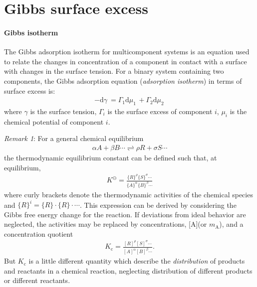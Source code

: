\section{Gibbs surface excess}\label{gibbs_surface_excess}
\paragraph{Gibbs isotherm}
The Gibbs adsorption isotherm for multicomponent systems is an equation used to relate the changes in concentration 
of a component in contact with a surface with changes in the surface tension. For a binary system containing two components, 
the Gibbs adsorption equation (\emph{adsorption isotherm}) in terms of surface excess is:
\begin{eqnarray}
\label{1}
-\mathrm{d}\gamma\ = \Gamma_1\mathrm{d}\mu_1\, + \Gamma_2\mathrm{d}\mu_2\,
\end{eqnarray}
where
$\gamma$ is the surface tension,
$\Gamma_i$ is the surface excess of component $i$,
$\mu_i$ is the chemical potential of component $i$.

\emph{Remark 1}:
For a general chemical equilibrium
\begin{eqnarray}
\label{c1}
\alpha A +\beta B \cdots \rightleftharpoons \rho R+\sigma S \cdots
\end{eqnarray}
the thermodynamic equilibrium constant can be defined such that, at equilibrium,
\begin{eqnarray}
\label{c2}
K^\ominus =\frac{{\{R\}} ^\rho {\{S\}}^\sigma \cdots } {{\{A\}}^\alpha {\{B\}}^\beta \cdots}
\end{eqnarray}
where curly brackets denote the thermodynamic activities of the chemical species and 
${\{R\}}^i= \{R\}\cdot\{R\}\cdot \cdots$. This expression can be derived by considering the Gibbs free energy 
change for the reaction. If deviations from ideal behavior are neglected, the activities may be replaced by concentrations,
[A](or $m_\text{A}$), and a concentration quotient
\begin{eqnarray}
\label{c3}
K_\text{c}=\frac{{[R]} ^\rho {[S]}^\sigma \cdots } {{[A]}^\alpha {[B]}^\beta \cdots}.
\end{eqnarray}
But $K_\text{c}$ is a little different quantity which describe the \emph{distribution} of products and reactants in a chemical reaction, 
neglecting distribution of different products or different reactants.

